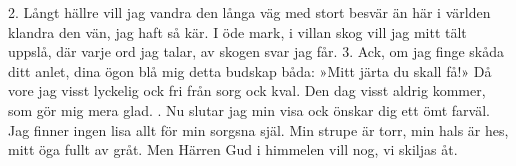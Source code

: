 \setlength{\columnsep}{0.5cm}
\begin{multicols}{2}
2.  Långt hällre vill jag vandra
    den långa väg med stort besvär
    än här i världen klandra
    den vän, jag haft så kär.
    I öde mark, i villan skog
    vill jag mitt tält uppslå,
    där varje ord jag talar,
    av skogen svar jag får.
3.  Ack, om jag finge skåda
    ditt anlet, dina ögon blå
    mig detta budskap båda:
    »Mitt järta du skall få!»
    Då vore jag visst lyckelig
    ock fri från sorg ock kval.
    Den dag visst aldrig kommer,
    som gör mig mera glad.
\vfill{}.  Nu slutar jag min visa
    ock önskar dig ett ömt farväl.
    Jag finner ingen lisa
    allt för min sorgsna själ.
    Min strupe är torr, min hals är hes,
    mitt öga fullt av gråt.
    Men Härren Gud i himmelen
    vill nog, vi skiljas åt.
\end{multicols}
